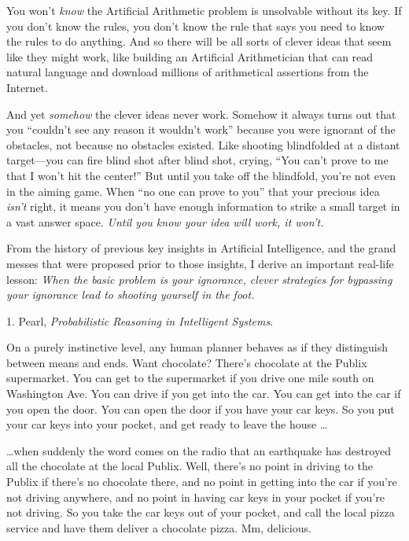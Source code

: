 {
 You won't \textit{know} the Artificial Arithmetic
problem is unsolvable without its key. If you don't
know the rules, you don't know the rule that says you
need to know the rules to do anything. And so there will be all sorts
of clever ideas that seem like they might work, like building an
Artificial Arithmetician that can read natural language and download
millions of arithmetical assertions from the Internet.}

{
 And yet \textit{somehow} the clever ideas never work. Somehow it
always turns out that you ``couldn't
see any reason it wouldn't work''
because you were ignorant of the obstacles, not because no obstacles
existed. Like shooting blindfolded at a distant target---you can fire
blind shot after blind shot, crying, ``You
can't prove to me that I won't hit the
center!'' But until you take off the blindfold,
you're not even in the aiming game. When
``no one can prove to you'' that
your precious idea \textit{isn't} right, it means you
don't have enough information to strike a small target
in a vast answer space. \textit{Until you know your idea will work, it
won't.}}

{
 From the history of previous key insights in Artificial
Intelligence, and the grand messes that were proposed prior to those
insights, I derive an important real-life lesson: \textit{When the
basic problem is your ignorance, clever strategies for bypassing your
ignorance lead to shooting yourself in the foot.}}

\myendsectiontext


\bigskip

{
 1. Pearl, \textit{Probabilistic Reasoning in Intelligent
Systems}.}


{
 On a purely instinctive level, any human planner behaves as if
they distinguish between means and ends. Want chocolate?
There's chocolate at the Publix supermarket. You can
get to the supermarket if you drive one mile south on Washington Ave.
You can drive if you get into the car. You can get into the car if you
open the door. You can open the door if you have your car keys. So you
put your car keys into your pocket, and get ready to leave the house
\ldots }

{
 \ldots when suddenly the word comes on the radio that an earthquake
has destroyed all the chocolate at the local Publix. Well,
there's no point in driving to the Publix if
there's no chocolate there, and no point in getting
into the car if you're not driving anywhere, and no
point in having car keys in your pocket if you're not
driving. So you take the car keys out of your pocket, and call the
local pizza service and have them deliver a chocolate pizza. Mm,
delicious.}

